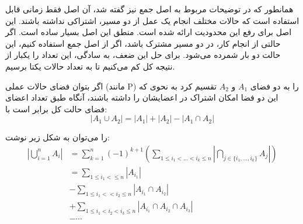 \documentclass[
    11pt,
    largemargins,
    twoside,
    template_root=../,
    reference_icons=./Icons,
]{../BOOK}
\begin{document}

    \TOC


            \p
            همانطور که در توضیحات مربوط به اصل جمع نیز گفته شد، آن اصل
            فقط زمانی قابل استفاده است که حالات مختلف انجام یک عمل از دو مسیر،
            اشتراکی نداشته باشند. این اصل برای رفع این محدودیت ارائه شده است.
            منطق این اصل بسیار ساده است. اگر حالتی از انجام کار، در دو مسیر مشترک باشد،
            اگر از اصل جمع استفاده کنیم، این حالت دو بار شمرده می‌شود. برای حل این ضعف،
            به سادگی، این تعداد را یکبار از نتیجه کل کم می‌کنیم تا به تعداد حالات یکتا برسیم.

            \begin{DEFINITION}
                \p
                اگر بتوان فضای حالات عملی
                (مانند P)
                را به دو فضای
                $A_1$
                و
                $A_2$
                تقسیم کرد به نحوی که این دو فضا امکان اشتراک در اعضایشان را داشته باشند،
                آنگاه طبق  تعداد اعضای فضای حالت کل برابر است با:
                $$|A_1 \cup	A_2| = |A_1| + |A_2| - |A_1 \cap A_2|$$
            \end{DEFINITION}


            \begin{THEOREM}
                \p
                را می‌توان به شکل زیر نوشت:
                \begin{align*}
                    |\bigcup\limits_{i=1}^n A_i| &= \sum\limits_{k=1}^n (-1)^{k+1} (\sum\limits_{1 \leq i_1 < \dots < i_k \leq n} |\bigcap\limits_{j \in \{i_1,...,i_k\}} A_j|) \\
                    &= \sum\limits_{1 \leq i_1 < \leq n} |A_{i_1}| \\
                    &- \sum\limits_{1 \leq i_1 < < i_2 \leq n} |A_{i_1} \cap A_{i_2}| \\
                    &+ \sum\limits_{1 \leq i_1 < i_2 < i_3 \leq n} |A_{i_1} \cap A_{i_2} \cap A_{i_3}| \\
                    &- \cdots
                \end{align*}
                 $$$$
            \end{THEOREM}
\end{document}
